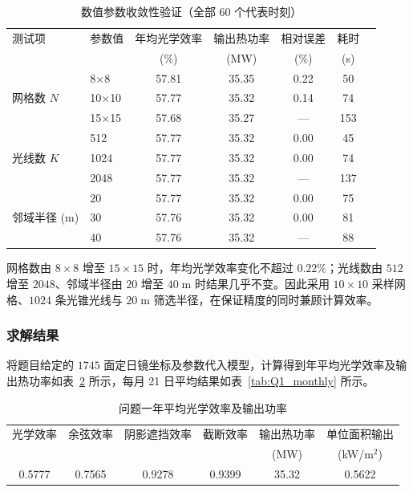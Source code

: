 \documentclass[12pt,a4paper,fontset=fandol]{ctexart}
\begin{document}
\begin{table}[H]
    \centering
    \small
    \caption{数值参数收敛性验证（全部 60 个代表时刻）}
    \label{tab:convergence}
    \begin{tabular}{llccccc}
        \toprule
        测试项 & 参数值 & 年均光学效率 & 输出热功率 & 相对误差 & 耗时 \\
        & & (\%) & (MW) & (\%) & (s) \\
        \midrule
        \multirow{3}{*}{网格数 $N$} & 8$\times$8 & 57.81 & 35.35 & 0.22 & 50 \\
        & 10$\times$10 & 57.77 & 35.32 & 0.14 & 74 \\
        & 15$\times$15 & 57.68 & 35.27 & — & 153 \\
        \midrule
        \multirow{3}{*}{光线数 $K$} & 512 & 57.77 & 35.32 & 0.00 & 45 \\
        & 1024 & 57.77 & 35.32 & 0.00 & 74 \\
        & 2048 & 57.77 & 35.32 & — & 137 \\
        \midrule
        \multirow{3}{*}{邻域半径 (m)} & 20 & 57.77 & 35.32 & 0.00 & 75 \\
        & 30 & 57.76 & 35.32 & 0.00 & 81 \\
        & 40 & 57.76 & 35.32 & — & 88 \\
        \bottomrule
    \end{tabular}
\end{table}

网格数由 $8\times8$ 增至 $15\times15$ 时，年均光学效率变化不超过 $0.22\%$；光线数由 $512$ 增至 $2048$、邻域半径由 $20$ 增至 $40\;\mathrm{m}$ 时结果几乎不变。因此采用 $10\times10$ 采样网格、$1024$ 条光锥光线与 $20\;\mathrm{m}$ 筛选半径，在保证精度的同时兼顾计算效率。

\subsubsection{求解结果}

将题目给定的 $1745$ 面定日镜坐标及参数代入模型，计算得到年平均光学效率及输出热功率如表~\ref{tab:Q1_annual} 所示，每月 21 日平均结果如表~\ref{tab:Q1_monthly} 所示。

\begin{table}[H]
    \centering
    \small
    \caption{问题一年平均光学效率及输出功率}
    \label{tab:Q1_annual}
    \begin{tabular}{cccccc}
        \toprule
        光学效率 & 余弦效率 & 阴影遮挡效率 & 截断效率 & 输出热功率 & 单位面积输出 \\
        & & & & (MW) & (kW/m$^{2}$) \\
        \midrule
        0.5777 & 0.7565 & 0.9278 & 0.9399 & 35.32 & 0.5622 \\
        \bottomrule
    \end{tabular}
\end{table}
\end{document}
